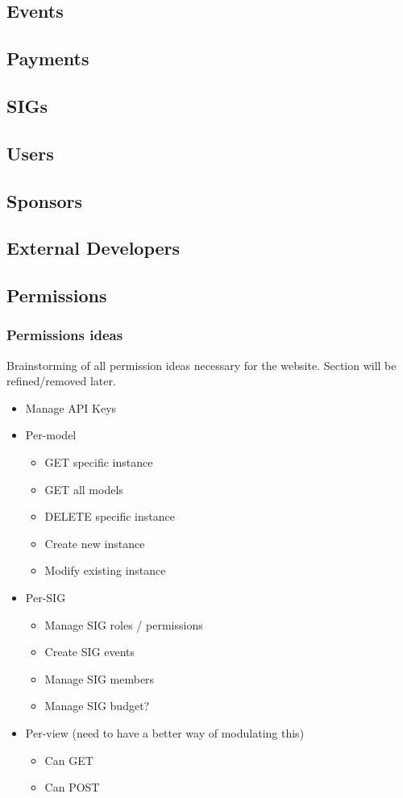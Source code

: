 \documentclass{article}
\begin{document}
\subsection{Events}
\subsection{Payments}
\subsection{SIGs}
\subsection{Users}
\subsection{Sponsors}
\subsection{External Developers}
\subsection{Permissions}
\subsubsection{Permissions ideas}
Brainstorming of all permission ideas necessary for the website. Section will be 
refined/removed later.
\begin{itemize}
    \item Manage API Keys
    \item Per-model
    \begin{itemize}
        \item GET specific instance
        \item GET all models
        \item DELETE specific instance
        \item Create new instance
        \item Modify existing instance 
    \end{itemize}

    \item Per-SIG
    \begin{itemize}
        \item Manage SIG roles / permissions
        \item Create SIG events
        \item Manage SIG members
        \item Manage SIG budget?
    \end{itemize}

    \item Per-view (need to have a better way of modulating this)
    \begin{itemize}
        \item Can GET
        \item Can POST 
    \end{itemize}


\end{itemize}
\end{document}

